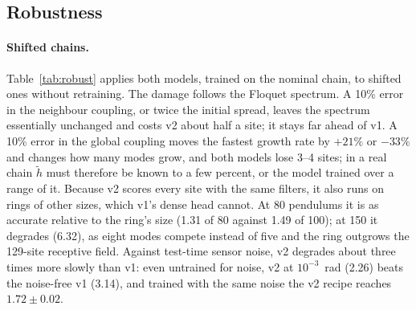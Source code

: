 \documentclass[11pt]{article}
\newcommand{\htl}{\tilde h}
\begin{document}
\subsection{Robustness}
\label{sec:robust}

\paragraph{Shifted chains.} Table~\ref{tab:robust} applies both models, trained on the nominal chain, to shifted ones without retraining. The damage follows the Floquet spectrum. A 10\% error in the neighbour coupling, or twice the initial spread, leaves the spectrum essentially unchanged and costs v2 about half a site; it stays far ahead of v1. A 10\% error in the global coupling moves the fastest growth rate by $+21\%$ or $-33\%$ and changes how many modes grow, and both models lose 3--4 sites; in a real chain $\htl$ must therefore be known to a few percent, or the model trained over a range of it. Because v2 scores every site with the same filters, it also runs on rings of other sizes, which v1's dense head cannot. At 80 pendulums it is as accurate relative to the ring's size (1.31 of 80 against 1.49 of 100); at 150 it degrades (6.32), as eight modes compete instead of five and the ring outgrows the 129-site receptive field. Against test-time sensor noise, v2 degrades about three times more slowly than v1: even untrained for noise, v2 at $10^{-3}$~rad (2.26) beats the noise-free v1 (3.14), and trained with the same noise the v2 recipe reaches $1.72\pm0.02$.
\end{document}
